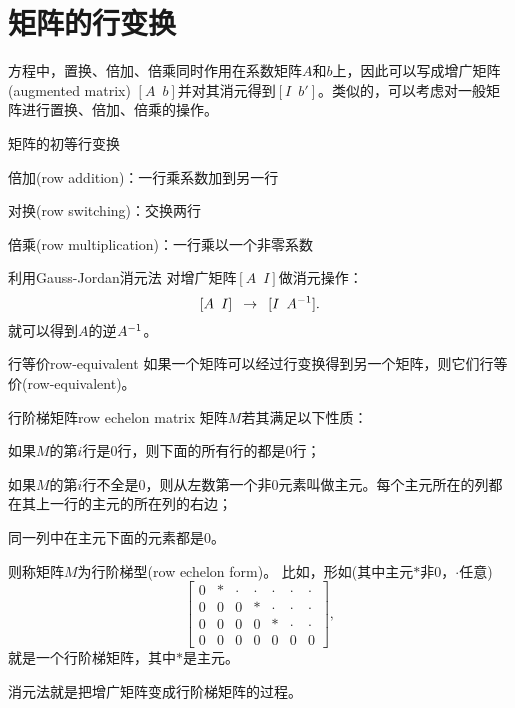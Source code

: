 \section{矩阵的行变换}
方程中，置换、倍加、倍乘同时作用在系数矩阵$A$和$b$上，因此可以写成增广矩阵(augmented matrix) $[A\enspace b]$并对其消元得到$[I\enspace b']$。类似的，可以考虑对一般矩阵进行置换、倍加、倍乘的操作。
\begin{definition}{矩阵的初等行变换}{}
	\begin{compactitem}
		\item 倍加(row addition)：一行乘系数加到另一行
		\item 对换(row switching)：交换两行
		\item 倍乘(row multiplication)：一行乘以一个非零系数
	\end{compactitem}
\end{definition}

\begin{remark}
	利用Gauss-Jordan消元法%
	对增广矩阵$[A\enspace I]$做消元操作：
	\[
		[A\enspace I]\enspace\to\enspace[I\enspace A^{-1}].
	\]
	就可以得到$A$的逆$A^{-1}$。
\end{remark}

\begin{definition}{行等价}{row-equivalent}
	如果一个矩阵可以经过行变换得到另一个矩阵，则它们行等价(row-equivalent)。
\end{definition}

\begin{definition}{行阶梯矩阵}{row echelon matrix}
	矩阵$M$若其满足以下性质：
	\begin{compactitem}
		\item 如果$M$的第$i$行是0行，则下面的所有行的都是0行；
		\item 如果$M$的第$i$行不全是0，则从左数第一个非0元素叫做主元。每个主元所在的列都在其上一行的主元的所在列的右边；
		\item 同一列中在主元下面的元素都是0。
	\end{compactitem}
	则称矩阵$M$为行阶梯型(row echelon form)。
	\tcblower
	比如，形如(其中主元$\ast$非0，$\cdot$任意)
	\[
		\begin{bmatrix}
			0&\ast&\cdot&\cdot&\cdot&\cdot&\cdot\\
			0&0&0&\ast&\cdot&\cdot&\cdot\\
			0&0&0&0&\ast&\cdot&\cdot\\
			0&0&0&0&0&0&0
		\end{bmatrix},
	\]
	就是一个行阶梯矩阵，其中$\ast$是主元。
\end{definition}
\begin{remark}
	消元法就是把增广矩阵变成行阶梯矩阵的过程。
\end{remark}

